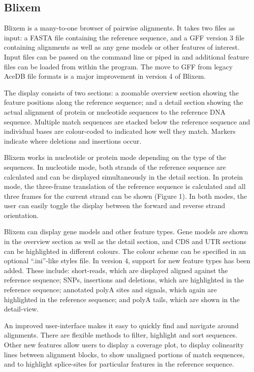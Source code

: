 \documentclass[10pt]{bmc_article}
\newenvironment{bmcformat}{\begin{raggedright}\baselineskip20pt\sloppy\setboolean{publ}{false}}{\end{raggedright}\baselineskip20pt\sloppy}
\begin{document}
\begin{bmcformat}
\subsection*{Blixem}
Blixem is a many-to-one browser of pairwise alignments. It takes two files as input: a FASTA file containing the reference sequence, and a GFF version 3 file containing alignments as well as any gene models or other features of interest. Input files can be passed on the command line or piped in and additional feature files can be loaded from within the program. The move to GFF from legacy AceDB file formats is a major improvement in version 4 of Blixem.

The display consists of two sections: a zoomable overview section showing the feature positions along the reference sequence; and a detail section showing the actual alignment of protein or nucleotide sequences to the reference DNA sequence. Multiple match sequences are stacked below the reference sequence and individual bases are colour-coded to indicated how well they match. Markers indicate where deletions and insertions occur.

Blixem works in nucleotide or protein mode depending on the type of the sequences.  In nucleotide mode, both strands of the reference sequence are calculated and can be displayed simultaneously in the detail section.  In protein mode, the three-frame translation of the reference sequence is calculated and all three frames for the current strand can be shown (Figure 1).  In both modes, the user can easily toggle the display between the forward and reverse strand orientation.

Blixem can display gene models and other feature types.  Gene models are shown in the overview section as well as the detail section, and CDS and UTR sections can be highlighted in different colours.  The colour scheme can be specified in an optional ``.ini''-like styles file.  In version 4, support for new feature types has been added. These include: short-reads, which are displayed aligned against the reference sequence; SNPs, insertions and deletions, which are highlighted in the reference sequence; annotated polyA sites and signals, which again are highlighted in the reference sequence; and polyA tails, which are shown in the detail-view.

An improved user-interface makes it easy to quickly find and navigate around alignments. There are flexible methods to filter, highlight and sort sequences. Other new features allow users to display a coverage plot, to display colinearity lines between alignment blocks, to show unaligned portions of match sequences, and to highlight splice-sites for particular features in the reference sequence. 


\end{bmcformat}
\end{document}

